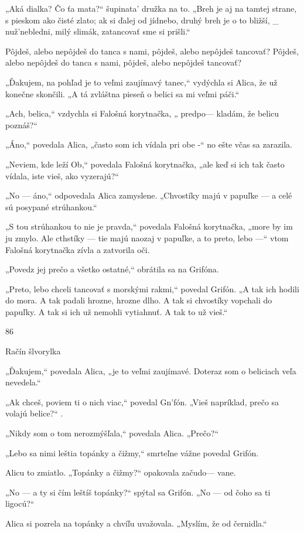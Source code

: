 \documentclass[12pt]{article}
\begin{document}
\begin{Parallel}[p]{}{}
{{„Aká dialka? Čo ťa mata?“ šupinata' družka na to.
„Breh je aj na tamtej strane, s pieskom ako čisté zlato;
ak si ďalej od jídnebo, druhý breh je o to bližší, _
nuž'nebledni, milý slimák, zatancovať sme si prišli.“

Pôjdeš, alebo nepôjdeš do tanca s nami,
pôjdeš, alebo nepôjdeš tancovať?
Pôjdeš, alebo nepôjdeš do tanca s nami,
pôjdeš, alebo nepôjdeš tancovať?

„Ďakujem, na pohľad je to veľmi zaujímavý tanec,“
vydýchla si Alica, že už konečne skončili. „A tá zvláštna
pieseň o belici sa mi veľmi páči.“

„Ach, belica,“ vzdychla si Falošná korytnačka, „ predpo—
kladám, že belicu poznáš?“

„Áno,“ povedala Alica, „často som ich vídala pri obe -“
no ešte včas sa zarazila.

„Neviem, kde leží Ob,“ povedala Falošná korytnačka,
„ale keď si ich tak často vídala, iste vieš, ako vyzerajú?“

„No — áno,“ odpovedala Alica zamyslene. „Chvostíky
majú v papuľke — a celé sú posypané strúhankou.“

„S tou strúhankou to nie je pravda,“ povedala Falošná
korytnačka, „more by im ju zmylo. Ale cthstíky — tie majú
naozaj v papuľke, a to preto, lebo —“ vtom Falošná
korytnačka zívla a zatvorila oči.

„Povedz jej prečo a všetko ostatné,“ obrátila sa na
Grifóna.

„Preto, lebo chceli tancovať s morskými rakmi,“ povedal
Grifón. „A tak ich hodili do mora. A tak padali hrozne,
hrozne dlho. A tak si chvostíky vopchali do papuľky. A tak
si ich už nemohli vytiahnuť. A tak to už vieš.“

86

Račín šlvorylka

„Ďakujem,“ povedala Alica, „je to veľmi zaujímavé.
Doteraz som o beliciach veľa nevedela.“

„Ak chceš, poviem ti o nich viac,“ povedal Gn'fón. „Vieš
napríklad, prečo sa volajú belice?“ .

„Nikdy som o tom nerozmýšľala,“ povedala Alica.
„Prečo?“

„Lebo sa nimi leštia topánky a čižmy,“ smrteľne vážne
povedal Grifón.

Alicu to zmiatlo. „Topánky a čižmy?“ opakovala začudo—
vane.

„No — a ty si čím leštíš topánky?“ spýtal sa Grifón. „No
— od čoho sa ti ligocú?“

Alica si pozrela na topánky a chvíľu uvažovala. „Myslím,
že od černidla.“

}}
\end{Parallel}
\end{document}
